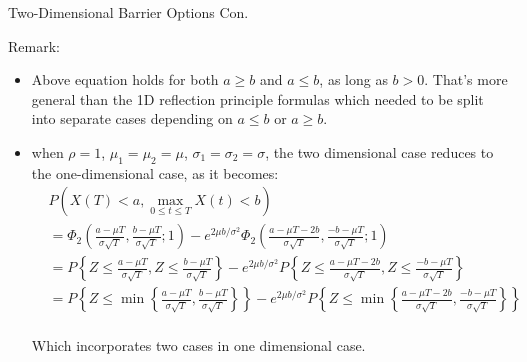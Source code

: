 \documentclass{beamer}
\begin{document}
\begin{frame}{Two-Dimensional Barrier Options Con.}
    
    {\footnotesize \footnotesize
    \par Remark:
    \begin{itemize}
        \item Above equation holds for both \( a \geq b \) and \( a \leq b \), as long as \( b > 0 \).
        That's more general than the 1D reflection principle formulas which needed to be split into 
        separate cases depending on $a \leq b$ or $a \geq b$. \pause
        \item when \( \rho = 1 \), \( \mu_1 = \mu_2 = \mu \), \( \sigma_1 = \sigma_2 = \sigma \), 
        the two dimensional case reduces to the one-dimensional case, as it becomes:
        {\footnotesize \scriptsize
        \begin{align*}
        &P\left(X(T) < a, \max_{0 \leq t \leq T} X(t) < b\right) \\
        &= \Phi_2 \left( \frac{a - \mu T}{\sigma \sqrt{T}}, \frac{b - \mu T}{\sigma \sqrt{T}}; 1 \right) - e^{2\mu b / \sigma^2} \Phi_2 \left( \frac{a - \mu T - 2b}{\sigma \sqrt{T}}, \frac{-b - \mu T}{\sigma \sqrt{T}}; 1 \right) \\
        &= P \left\{ Z \leq \frac{a - \mu T}{\sigma \sqrt{T}}, Z \leq \frac{b - \mu T}{\sigma \sqrt{T}} \right\}
         - e^{2\mu b / \sigma^2} P \left\{ Z \leq \frac{a - \mu T - 2b}{\sigma \sqrt{T}}, Z \leq \frac{-b - \mu T}{\sigma \sqrt{T}} \right\}\\
        &=P \left\{ Z \leq \min\left\{\frac{a - \mu T}{\sigma \sqrt{T}}, \frac{b - \mu T}{\sigma \sqrt{T}}\right\} \right\}
         - e^{2\mu b / \sigma^2} P \left\{ Z \leq \min\left\{\frac{a - \mu T - 2b}{\sigma \sqrt{T}},\frac{-b - \mu T}{\sigma \sqrt{T}}\right\}  \right\}\\
        \end{align*}
        }
        \par Which incorporates two cases in one dimensional case.
    \end{itemize}
    }

\end{frame}
\end{document}
